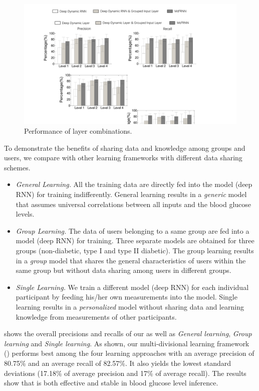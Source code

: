 \begin{figure}[h]
  \centering
  \includegraphics[width=0.9\columnwidth]{./img/CMP_Models2.pdf}
  \caption{Performance of layer combinations.}
  \label{fig:cmp_model}
\end{figure}

To demonstrate the benefits of sharing data and knowledge among groups and users, we compare \modelname with other learning frameworks with different data sharing schemes.
\begin{itemize}
  \item \emph{General Learning.}
  All the training data are directly fed into the model (\ie deep RNN) for training indifferently.
  General learning results in a \emph{generic} model that assumes universal correlations between all inputs and the blood glucose levels.
  \item \emph{Group Learning.}
  The data of users belonging to a same group are fed into a model (\ie deep RNN) for training.
  Three separate models are obtained for three groups (\ie non-diabetic, type I and type II diabetic).
  The group learning results in a \emph{group} model that shares the general characteristics of users within the same group but without data sharing among users in different groups.
  \item \emph{Single Learning.}
  We train a different model (\ie deep RNN) for each individual participant by feeding his/her own measurements into the model.
  Single learning results in a \emph{personalized} model without sharing data and learning knowledge from measurements of other participants.
\end{itemize}

 shows the overall precisions and recalls of our \modelname as well as \emph{General learning}, \emph{Group learning} and \emph{Single learning}.
As shown, our multi-divisional learning framework (\modelname) performs best among the four learning approaches with an average precision of 80.75\% and an average recall of 82.57\%.
It also yields the lowest standard deviations (17.18\% of average precision and 17\% of average recall).
The results show that \modelname is both effective and stable in blood glucose level inference.

